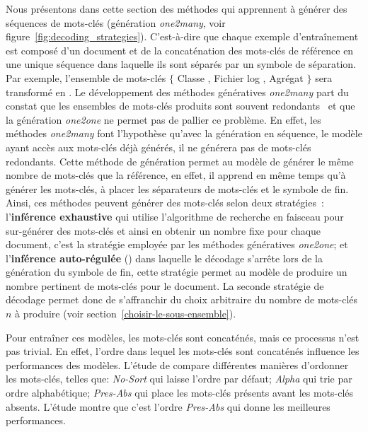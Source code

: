 Nous présentons dans cette section des méthodes qui apprennent à générer des séquences de mots-clés (génération \emph{one2many}, voir figure~\ref{fig:decoding_strategies}). C'est-à-dire que chaque exemple d'entraînement est composé d'un document et de la concaténation des mots-clés de référence en une unique séquence dans laquelle ils sont séparés par un symbole de séparation. Par exemple, l'ensemble de mots-clés $\{$ Classe , Fichier log , Agrégat $\}$ sera transformé en .
Le développement des méthodes génératives \emph{one2many} part du constat que les ensembles de mots-clés produits sont souvent redondants~\cite{hasan_automatic_2014} et que la génération \emph{one2one} ne permet pas de pallier ce problème.
En effet, les méthodes \emph{one2many} font l'hypothèse qu'avec la génération en séquence, le modèle ayant accès aux mots-clés déjà générés, il ne générera pas de mots-clés redondants.
%
Cette méthode de génération permet au modèle de générer le même nombre de mots-clés que la référence, en effet, il apprend en même temps qu'à générer les mots-clés, à placer les séparateurs de mots-clés et le symbole de fin.
Ainsi, ces méthodes peuvent générer des mots-clés selon deux stratégies~\cite{yuan_one_2020}: l'\textbf{inférence exhaustive} qui utilise l'algorithme de recherche en faisceau pour sur-générer des mots-clés et ainsi en obtenir un nombre fixe pour chaque document, c'est la stratégie employée par les méthodes génératives \emph{one2one}; et l'\textbf{inférence auto-régulée} () dans laquelle le décodage s'arrête lors de la génération du symbole de fin, cette stratégie permet au modèle de produire un nombre pertinent de mots-clés pour le document.
La seconde stratégie de décodage permet donc de s'affranchir du choix arbitraire du nombre de mots-clés $n$ à produire (voir section~\ref{choisir-le-sous-ensemble}).

Pour entraîner ces modèles, les mots-clés sont concaténés, mais ce processus n'est pas trivial.
En effet, l'ordre dans lequel les mots-clés sont concaténés influence les performances des modèles.
L'étude de \citet{meng_empirical_2021} compare différentes manières d'ordonner les mots-clés, telles que: \emph{No-Sort} qui laisse l'ordre par défaut; \emph{Alpha} qui trie par ordre alphabétique; \emph{Pres-Abs} qui place les mots-clés présents avant les mots-clés absents. L'étude montre que c'est l'ordre \emph{Pres-Abs} qui donne les meilleures performances.

